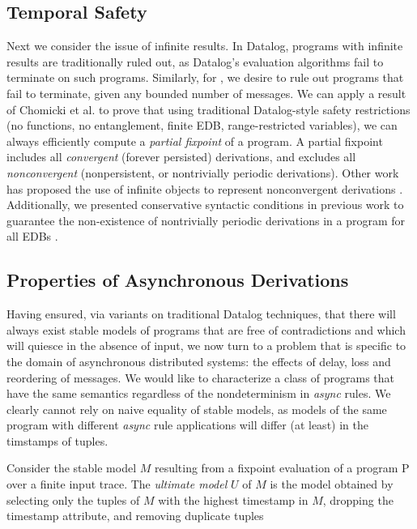 \subsection{Temporal Safety}

Next we consider the issue of infinite results.  In Datalog, programs with infinite results are traditionally ruled out, as Datalog's evaluation algorithms fail to terminate on such programs.  Similarly, for \lang, we desire to rule out programs that fail to terminate, given any bounded number of messages.  We can apply a result of Chomicki et al.  to prove that using traditional Datalog-style safety restrictions (no functions, no entanglement, finite EDB, range-restricted variables), we can always efficiently compute a {\em partial fixpoint} of a \lang program.  A partial fixpoint includes all {\em convergent} (forever persisted) derivations, and excludes all {\em nonconvergent} (nonpersistent, or nontrivially periodic derivations).  Other work has proposed the use of infinite objects to represent nonconvergent derivations .  Additionally, we presented conservative syntactic conditions in previous work to guarantee the non-existence of nontrivially periodic derivations in a program for all EDBs .

\subsection{Properties of Asynchronous Derivations}

Having ensured, via variants on traditional Datalog techniques, that there will always exist 
stable models  of \lang programs that are free of contradictions and which will quiesce in the absence of input, we now turn to a problem that is specific to the domain of asynchronous
distributed systems: the effects of delay, loss and reordering of messages. We would like to
characterize a class of \lang programs that have the same semantics regardless of
the nondeterminism in {\em async} rules.  We clearly cannot rely on naive equality of stable
models, as models of the same program with different {\em async} rule applications will differ
(at least) in the timstamps of tuples.

\begin{definition}
Consider the stable model $M$ resulting from a fixpoint evaluation of a \lang program P over a finite input trace.  The \emph{ultimate model} $U$ of $M$ is the model obtained by selecting only the tuples of $M$ with the highest timestamp in $M$, dropping the timestamp attribute,
and removing duplicate tuples
\end{definition}

